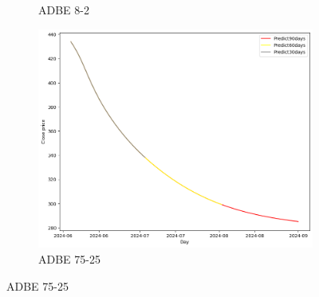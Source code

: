 \documentclass{ieeeojies}
\begin{document}
\begin{figure}[H]
\begin{subfigure}[b]{0.33\linewidth}
        \caption{ADBE 8-2}
        \label{fig:adbe-8-2}
    \end{subfigure}%
    \hfill
    \begin{subfigure}[b]{0.33\linewidth}
        \centering
        \includegraphics[width=\linewidth]{LSTM Plot/ADBE_LSTM_75_25-90.png}
        \caption{ADBE 75-25}
        \label{fig:adbe-75-25}
    \end{subfigure}
\end{figure}
\vspace{-20pt}
\end{document}

